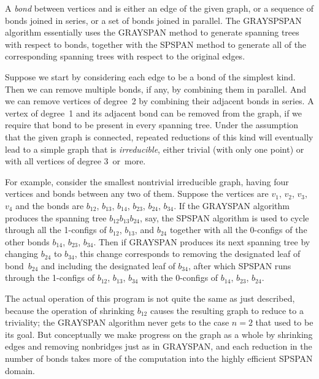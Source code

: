 A {\it bond\/} between vertices  and  is either an edge of the
given graph, or a sequence of bonds joined in series, or a set of bonds
joined in parallel.
The {\mc GRAYSPSPAN} algorithm essentially uses
the {\mc GRAYSPAN} method to generate spanning trees with respect to bonds,
together with the {\mc SPSPAN} method to generate all of the corresponding
spanning trees with respect to the original edges.

Suppose we start by considering each edge to be a bond of the simplest kind.
Then we can remove multiple bonds, if any, by combining them in parallel.
And we can remove vertices of degree~2 by combining their adjacent bonds
in series. A vertex of degree~1 and its adjacent bond can be removed
from the graph, if we require that bond to be present in every spanning tree.
Under the assumption that the given graph is connected, repeated reductions
of this kind will eventually lead to a simple graph that is {\it irreducible},
either trivial (with only one point) or with all vertices of degree
3~or~more.

For example, consider the smallest nontrivial irreducible graph,
having four vertices and bonds between any two of them. Suppose the
vertices are $v_1$, $v_2$, $v_3$, $v_4$ and the bonds are $b_{12}$,
$b_{13}$, $b_{14}$, $b_{23}$, $b_{24}$, $b_{34}$. If the {\mc GRAYSPAN}
algorithm produces the spanning tree $b_{12}b_{13}b_{24}$, say, the
{\mc SPSPAN} algorithm is used to cycle through all the 1-configs of
$b_{12}$, $b_{13}$, and $b_{24}$ together with all the 0-configs
of the other bonds $b_{14}$, $b_{23}$, $b_{34}$. Then if {\mc GRAYSPAN}
produces its next spanning tree by changing $b_{24}$ to $b_{34}$,
this change corresponds to removing the designated leaf of bond~$b_{24}$
and including the designated leaf of $b_{34}$, after which {\mc SPSPAN}
runs through the 1-configs of $b_{12}$, $b_{13}$, $b_{34}$ with the
0-configs of $b_{14}$, $b_{23}$, $b_{24}$.

The actual operation of this program is not quite the same as
just described, because the
operation of shrinking $b_{12}$ causes the resulting graph to reduce to a
triviality; the {\mc GRAYSPAN} algorithm never gets to the
case $n=2$ that used to be its goal. But conceptually we make progress
on the graph as a whole
by shrinking edges and removing nonbridges just as in {\mc GRAYSPAN},
and each reduction in the number of bonds takes more of the computation
into the highly efficient {\mc SPSPAN} domain.

\fi

